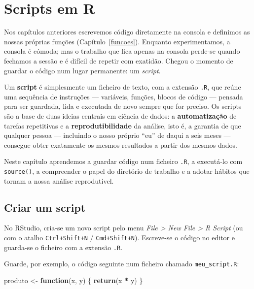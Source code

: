 \documentclass[
  portuguese,
  11pt,
  openany]{book}
\newenvironment{Shaded}{\begin{snugshade}}{\end{snugshade}}
\newcommand{\ControlFlowTok}[1]{\textcolor[rgb]{0.13,0.29,0.53}{\textbf{#1}}}
\newcommand{\FunctionTok}[1]{\textcolor[rgb]{0.13,0.29,0.53}{\textbf{#1}}}
\newcommand{\NormalTok}[1]{#1}
\newcommand{\OtherTok}[1]{\textcolor[rgb]{0.56,0.35,0.01}{#1}}
\newcommand{\SpecialCharTok}[1]{\textcolor[rgb]{0.81,0.36,0.00}{\textbf{#1}}}
\begin{document}
\chapter{Scripts em R}\label{scripts}

Nos capítulos anteriores escrevemos código diretamente na consola e definimos as
nossas próprias funções (Capítulo~\ref{funcoes}). Enquanto experimentamos, a
consola é cómoda; mas o trabalho que fica apenas na consola perde-se quando
fechamos a sessão e é difícil de repetir com exatidão. Chegou o momento de guardar
o código num lugar permanente: um \emph{script}.

Um \textbf{script} é simplesmente um ficheiro de texto, com a extensão \texttt{.R}, que reúne
uma sequência de instruções --- variáveis, funções, blocos de código --- pensada para
ser guardada, lida e executada de novo sempre que for preciso. Os scripts são a
base de duas ideias centrais em ciência de dados: a \textbf{automatização} de tarefas
repetitivas e a \textbf{reprodutibilidade} da análise, isto é, a garantia de que
qualquer pessoa --- incluindo o nosso próprio ``eu'' de daqui a seis meses --- consegue
obter exatamente os mesmos resultados a partir dos mesmos dados.

Neste capítulo aprendemos a guardar código num ficheiro \texttt{.R}, a executá-lo com
\texttt{source()}, a compreender o papel do diretório de trabalho e a adotar hábitos que
tornam a nossa análise reprodutível.

\section{Criar um script}\label{criar-um-script}

No RStudio, cria-se um novo script pelo menu \emph{File \textgreater{} New File \textgreater{} R Script} (ou com
o atalho \texttt{Ctrl+Shift+N} / \texttt{Cmd+Shift+N}). Escreve-se o código no editor e guarda-se
o ficheiro com a extensão \texttt{.R}.

Guarde, por exemplo, o código seguinte num ficheiro chamado \texttt{meu\_script.R}:

\begin{Shaded}
\begin{Highlighting}[]
\NormalTok{produto }\OtherTok{\textless{}{-}} \ControlFlowTok{function}\NormalTok{(x, y) \{}
  \FunctionTok{return}\NormalTok{(x }\SpecialCharTok{*}\NormalTok{ y)}
\NormalTok{\}}
\end{Highlighting}
\end{Shaded}
\end{document}

